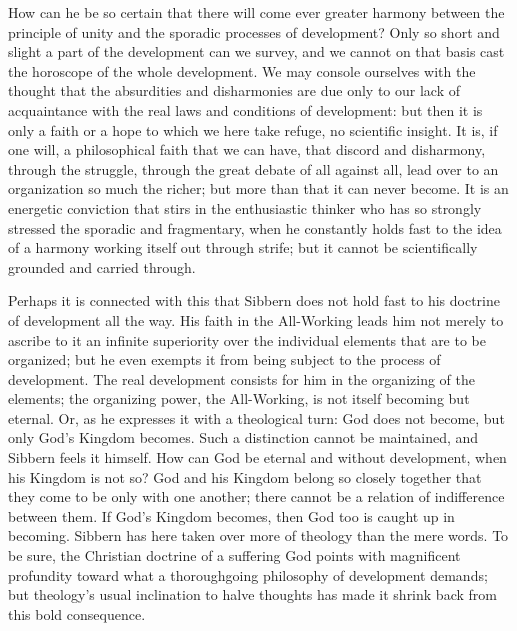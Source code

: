\documentclass[12pt,a4paper,openany]{book}
\newcommand{\opage}[1]{\marginnote{\footnotesize\textit{[#1]}}}
\begin{document}
How can he be so certain that there will come
ever greater harmony between the principle of unity and the sporadic
processes of development? Only so short and slight a part of the
development can we survey, and we cannot on that basis cast
the horoscope of the whole development. We may console ourselves with the thought
that the absurdities and disharmonies are due only to our lack
of acquaintance with the real laws and conditions of development:
but then it is only a faith or a hope to which we here take
refuge, no scientific insight. It is, if one will,
a philosophical faith that we can have, that discord and
disharmony, through the struggle, through the great debate of all against
\opage{90}all, lead over to an organization so much the richer;
but more than that it can never become. It is an energetic
conviction that stirs in the enthusiastic thinker who has so
strongly stressed the sporadic and fragmentary, when
he constantly holds fast to the idea of a harmony working itself out
through strife; but it cannot be scientifically
grounded and carried through.

Perhaps it is connected with this that Sibbern does not
hold fast to his doctrine of development all the way. His faith in the
All-Working leads him not merely to ascribe to it an
infinite superiority over the individual elements that
are to be organized; but he even exempts it from being
subject to the process of development. The real development
consists for him in the organizing of the elements; the organizing
power, the All-Working, is not itself becoming but eternal.
Or, as he expresses it with a theological turn: God
does not become, but only God's Kingdom becomes. Such a
distinction cannot be maintained, and Sibbern feels it himself.
How can God be eternal and without development, when his
Kingdom is not so? God and his Kingdom belong so closely
together that they come to be only with one another; there cannot
be a relation of indifference between them. If God's
Kingdom becomes, then God too is caught up in becoming. Sibbern has here
taken over more of theology than the mere words. To be sure,
the Christian doctrine of a suffering God points with magnificent
profundity toward what a thoroughgoing philosophy of development
demands; but theology's usual inclination to halve
thoughts has made it shrink back from this bold
consequence.
\end{document}
